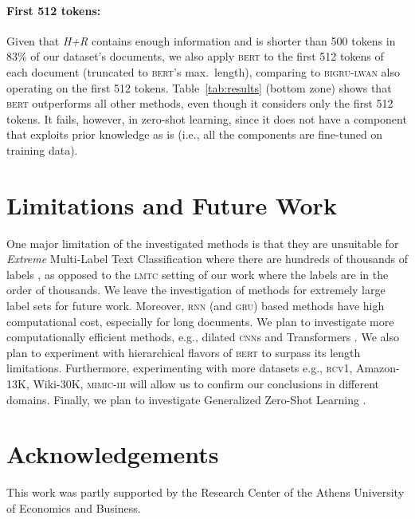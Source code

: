 \documentclass[11pt,a4paper]{article}
\newcommand{\gru}{\textsc{gru}\xspace}
\newcommand{\cnn}{\textsc{cnn}\xspace}
\newcommand{\lmtc}{\textsc{lmtc}\xspace}
\newcommand{\lwangru}{\textsc{bigru-lwan}\xspace}
\newcommand{\bert}{\textsc{bert}\xspace}
\newcommand{\rcv}{\textsc{rcv1}\xspace}
\newcommand{\mimiciii}{\textsc{mimic-iii}\xspace}
\begin{document}
\paragraph{First 512 tokens:} Given that \emph{H+R} contains enough information and is shorter than 500 tokens in 83\% of our dataset's documents, we also apply \bert to the first 512 tokens of each document (truncated to \bert's max.\ length), comparing to \lwangru also operating on the first 512 tokens. Table~\ref{tab:results} (bottom zone) shows that \bert outperforms all other methods, even though it considers only the first 512 tokens. It fails, however, in zero-shot learning, since it does not have a component that exploits prior knowledge as is (i.e., all the components are fine-tuned on training data).

\section{Limitations and Future Work}

One major limitation of the investigated methods is that they are unsuitable for \emph{Extreme} Multi-Label Text Classification where there are hundreds of thousands of labels \cite{Liu2017,Zhang2018,Wydmuch2018}, as opposed to the \lmtc setting of our work where the labels are in the order of thousands. We leave the investigation of methods for extremely large label sets for future work. Moreover, \textsc{rnn} (and \gru) based methods have high computational cost, especially for long documents. We plan to investigate more computationally efficient methods, e.g., dilated \cnn{s} \cite{KalchbrennerESO16} and Transformers \cite{Vaswani2017, Dai2019}. We also plan to experiment with hierarchical flavors of \bert to surpass its length limitations. Furthermore, experimenting with more datasets e.g., \rcv, Amazon-13K, Wiki-30K, \mimiciii will allow us to confirm our conclusions in different domains. Finally, we plan to investigate Generalized Zero-Shot Learning \cite{Liu2018}. 

\section*{Acknowledgements}
This work was partly supported by the Research Center of the Athens University of Economics and Business.

\vspace{-3mm}



\end{document}
